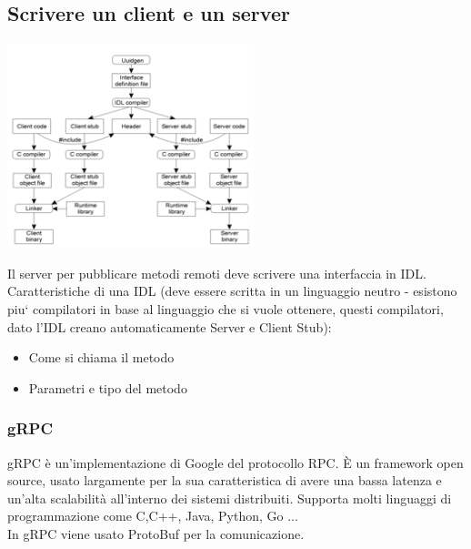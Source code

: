 \subsection{Scrivere un client e un server}
\begin{center}
    \includegraphics[width = .5\textwidth]{images/lezione3/writingrpc.png}
\end{center}
Il server per pubblicare metodi remoti deve scrivere una interfaccia in IDL. Caratteristiche di una IDL (deve essere scritta in un linguaggio neutro - esistono piu` compilatori in base al linguaggio che si vuole ottenere, questi compilatori, dato l’IDL creano automaticamente Server e Client Stub):
\begin{itemize}
    \item Come si chiama il metodo
    \item Parametri e tipo del metodo
\end{itemize}
 
\subsubsection{gRPC}
gRPC è un'implementazione di Google del protocollo RPC. È un framework open source, usato largamente per la sua caratteristica di avere una bassa latenza e un'alta scalabilità all'interno dei sistemi distribuiti. Supporta molti linguaggi di programmazione come C,C++, Java, Python, Go ...\\
In gRPC viene usato ProtoBuf per la comunicazione.


